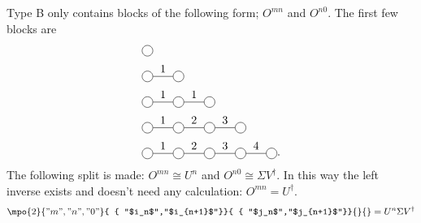 Type B only contains blocks of the following form; $O^{m n}$ and $O^{n 0}$. The first few blocks are
\begin{equation}
    \begin{split}
        &\mpob{1}{ {,}  }{}{}{}{{,,}} \\
        &\mpob{2}{ {,"1",}  }{}{}{}{{,,}}\\
        &\mpob{3}{ {,"1","1",}  }{}{}{}{{,,,}}\\
        &\mpob{4}{ {,"1","2","3",}  }{}{}{}{{,,,,,}}\\
        &\mpob{5}{ {,"1","2","3","4",}  }{}{}{}{{,,,,,}}.
    \end{split}
\end{equation}
The following split is made: $O^{m n} \cong U^n$ and $O^{n 0} \cong  \Sigma V^{\dagger}$. In this way the left inverse exists and doesn't need any calculation: $O^{m n} = U^{\dagger}$.
\def \rhs{\expH{2}{ $L_{m}^{-1}  M_{n+1} $ }{{"$i_n$","$i_{n+1}$"}}{{"$j_n$","$j_{n+1}$"}}{{"m","0"}}  }
\begin{equation}
    \begin{split}
        \mpo{2}{ {"m","n","0"}  }{ { "$i_n$","$i_{n+1}$"}}{ { "$j_n$","$j_{n+1}$"}}{}{} =  U^n  \Sigma V^{\dagger}\\
    \end{split}
\end{equation}

